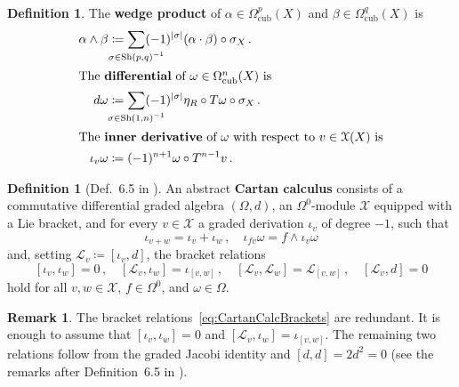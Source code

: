 \documentclass[12pt,reqno, a4paper]{amsart}
\numberwithin{equation}{section}
\theoremstyle{plain}
\theoremstyle{definition}
\newtheorem{Remark}[Theorem]{Remark}
\newtheorem{Definition}[Theorem]{Definition}
\theoremstyle{remark}
\DeclareMathOperator{\Shuff}{Sh}
\newcommand{\calX}{\mathcal{X}}
\newcommand{\Lie}{\mathcal{L}}
\newcommand{\Val}{\eta}
\begin{document}
\begin{Definition}
\label{def:WedgeDiffInnder}
The \textbf{wedge product} of $\alpha \in \Omega^p_\mathrm{cub}(X)$ and $\beta \in \Omega^q_\mathrm{cub}(X)$ is
\begin{align}
\label{eq:CubeWedge}
  \alpha \wedge \beta
  &\coloneqq
  \sum_{\mathclap{\sigma \in \Shuff(p,q)^{-1}}}
  (-1)^{|\sigma|}
  (\alpha \cdot \beta) \circ \sigma_X
  \,.
  \\
\intertext{The \textbf{differential} of $\omega \in \Omega^n_\mathrm{cub}(X)$ is}
\label{eq:dCubeDef}
  d\omega
  &\coloneqq
  \sum_{\mathclap{\sigma \in \Shuff(1,n)^{-1} }}
  (-1)^{|\sigma|}\Val_R \circ T\omega \circ \sigma_X
  \,.
  \\
\intertext{The \textbf{inner derivative} of $\omega$ with respect to $v \in \calX(X)$ is}
\label{eq:CubeInnDer}
  \iota_v \omega
  &\coloneqq
  (-1)^{n+1} \omega \circ T^{n-1}v
  \,.
\end{align}
\end{Definition}

\begin{Definition}[Def.~6.5 in \cite{AintablianBlohmann:2026}]
\label{def:CartanCalc}
An abstract \textbf{Cartan calculus} consists of a commutative differential graded algebra $(\Omega, d)$, an $\Omega^0$-module $\calX$ equipped with a Lie bracket, and for every $v \in \calX$ a graded derivation $\iota_v$ of degree $-1$, such that
\begin{equation}
\label{eq:InnDerOlinear}
  \iota_{v+w} = \iota_v + \iota_w
  \,,\quad
  \iota_{fv}\omega = f \wedge \iota_v\omega
\end{equation}
and, setting $\Lie_v \coloneqq [\iota_v, d]$, the bracket relations
\begin{equation}
\label{eq:CartanCalcBrackets}
  [\iota_v, \iota_w] = 0 \,,\quad
  [\Lie_v, \iota_w] = \iota_{[v,w]} \,,\quad
  [\Lie_v, \Lie_w] = \Lie_{[v,w]} \,,\quad
  [\Lie_v, d] = 0
\end{equation}
hold for all $v, w \in \calX$, $f \in \Omega^0$, and $\omega \in \Omega$.
\end{Definition}

\begin{Remark}
\label{rmk:CartanRedund}
The bracket relations~\eqref{eq:CartanCalcBrackets} are redundant. It is enough to assume that $[\iota_v, \iota_w] = 0$ and $[\Lie_v, \iota_w] = \iota_{[v,w]}$. The remaining two relations follow from the graded Jacobi identity and $[d,d] = 2d^2 = 0$ (see the remarks after Definition~6.5 in \cite{AintablianBlohmann:2026}).
\end{Remark}
\end{document}
